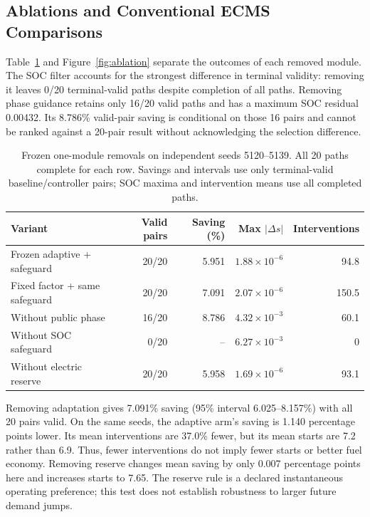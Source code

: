 \documentclass[energies,article,submit,moreauthors]{Definitions/mdpi}
\begin{document}
\subsection{Ablations and Conventional ECMS Comparisons}
Table~\ref{tab:ablation} and Figure~\ref{fig:ablation} separate the outcomes of each removed module. The SOC filter accounts for the strongest difference in terminal validity: removing it leaves 0/20 terminal-valid paths despite completion of all paths. Removing phase guidance retains only 16/20 valid paths and has a maximum SOC residual 0.00432. Its 8.786\% valid-pair saving is conditional on those 16 pairs and cannot be ranked against a 20-pair result without acknowledging the selection difference.

\begin{table}[H]
\caption{Frozen one-module removals on independent seeds 5120--5139. All 20 paths complete for each row. Savings and intervals use only terminal-valid baseline/controller pairs; SOC maxima and intervention means use all completed paths.}\label{tab:ablation}
\small\begin{tabularx}{\linewidth}{@{}Xrrrr@{}}\toprule
Variant & Valid pairs & Saving (\%) & Max $|\Delta s|$ & Interventions \\\midrule
Frozen adaptive + safeguard & 20/20 & 5.951 & $1.88\times10^{-6}$ & 94.8 \\
Fixed factor + same safeguard & 20/20 & 7.091 & $2.07\times10^{-6}$ & 150.5 \\
Without public phase & 16/20 & 8.786 & $4.32\times10^{-3}$ & 60.1 \\
Without SOC safeguard & 0/20 & -- & $6.27\times10^{-3}$ & 0 \\
Without electric reserve & 20/20 & 5.958 & $1.69\times10^{-6}$ & 93.1 \\\bottomrule
\end{tabularx}
\end{table}

Removing adaptation gives 7.091\% saving (95\% interval 6.025--8.157\%) with all 20 pairs valid. On the same seeds, the adaptive arm's saving is 1.140 percentage points lower. Its mean interventions are 37.0\% fewer, but its mean starts are 7.2 rather than 6.9. Thus, fewer interventions do not imply fewer starts or better fuel economy. Removing reserve changes mean saving by only 0.007 percentage points here and increases starts to 7.65. The reserve rule is a declared instantaneous operating preference; this test does not establish robustness to larger future demand jumps.
\end{document}
